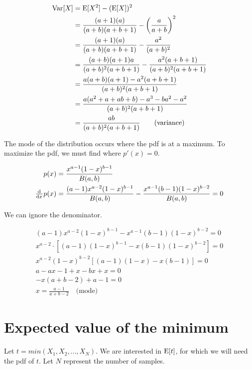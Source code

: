 \documentclass{article}
\begin{document}
\begin{align*}
  \mathrm{Var}[X] &= \mathrm{E}[X^2] - (\mathrm{E}[X])^2 \\
          &= \frac{(a+1)(a)}{(a+b)(a+b+1)} - \left(\frac{a}{a+b}\right)^2 \\
          &= \frac{(a+1)(a)}{(a+b)(a+b+1)} - \frac{a^2}{(a+b)^2} \\
          &= \frac{(a+b)(a+1)a}{(a+b)^2(a+b+1)} -
            \frac{a^2(a+b+1)}{(a+b)^2(a+b+1)} \\
          &= \frac{a(a+b)(a+1) - a^2(a+b+1)}{(a+b)^2(a+b+1)} \\
          &= \frac{a(a^2 + a + ab + b) - a^3 - ba^2 -
            a^2}{(a+b)^2(a+b+1)} \\
          &= \frac{ab}{(a+b)^2(a+b+1)} \qquad \text{(variance)}
\end{align*}

The mode of the distribution occurs where the pdf is at a maximum. To
maximize the pdf, we must find where $p'(x) = 0$.

\begin{align*}
  p(x) &= \frac{x^{a-1}(1-x)^{b-1}}{B(a,b)} \\
  \od{}{x} p(x) &= \frac{(a-1)x^{a-2}(1-x)^{b-1}}{B(a,b)} -
                 \frac{x^{a-1}(b-1)(1-x)^{b-2}}{B(a,b)} = 0 \\
\end{align*}

We can ignore the denominator.

\begin{gather*}
  (a-1)x^{a-2}(1-x)^{b-1} - x^{a-1}(b-1)(1-x)^{b-2} = 0 \\
  x^{a-2} \cdot \left[ (a-1)(1-x)^{b-1} - x(b-1)(1-x)^{b-2} \right] =
  0 \\
  x^{a-2}(1-x)^{b-2} \left[ (a-1)(1-x) - x(b-1) \right] = 0 \\
  a - ax - 1 + x - bx + x = 0 \\
  -x(a + b - 2) + a - 1 = 0 \\
  x = \frac{a-1}{a+b-2} \quad \text{(mode)}
\end{gather*}

\section{Expected value of the minimum}

Let $t = min(X_1,X_2,...,X_N)$. We are interested in $\mathrm{E}[t]$, for which we
will need the pdf of $t$. Let $N$ represent the number of samples.
\end{document}
